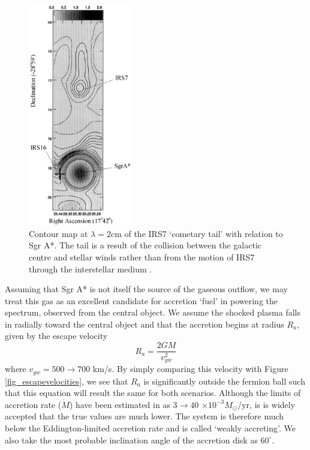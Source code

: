 \begin{figure}[p]
	\begin{center}
	\includegraphics[angle=0,width=0.4\textwidth]{eps/irs7.eps}
	\caption{Contour map at $\lambda=2$cm of the IRS7 `cometary tail' with relation to Sgr A*. The tail is a result of the collision between
	the galactic centre and stellar winds rather than from the motion of IRS7 through the interstellar medium \cite{ref_yusefmorris}.}
	\label{fig_irs7}
	\end{center}
\end{figure}

Assuming that Sgr A* is not itself the source of the gaseous outflow, we may treat this gas as an excellent candidate for accretion
`fuel' in powering the spectrum, observed from the central object. We assume the shocked plasma falls in radially toward the central
object and that the accretion begins at radius $R_a$, given by the escape velocity
\begin{equation}
	R_a=\frac{2GM}{v_{gw}^2}
	\label{eqn_accretionstartradius}
\end{equation}
where $v_{gw}= 500 \rightarrow 700$ km/s. By simply comparing this velocity with Figure \ref{fig_escapevelocities}, we see that $R_a$
is significantly outside the fermion ball such that this equation will result the same for both scenarios. Although the limits of
accretion rate ($\dot{M}$) have been estimated in \cite{ref_melia} as $3 \rightarrow 40$ $\times 10^{-3}M_\odot$/yr,
is is widely accepted that the true values are much lower. The system
is therefore much below the Eddington-limited accretion rate and is called `weakly accreting'.
We also take the most probable inclination angle of the accretion disk as $60^\circ$.

